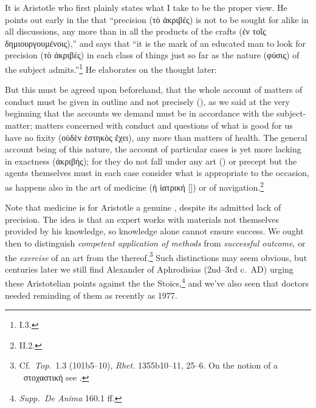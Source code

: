 \documentclass[11pt,letterpaper,oneside]{amsart} %
\begin{document}
It is Aristotle who first plainly states what I take to be the proper view. He points out early in the  that ``precision (τὸ ἀκριβές) is not to be sought for alike in all discussions, any more than in all the products of the crafts (ἐν τοῖς δημιουργουμένοις),'' and says that ``it is the mark of an educated man to look for precision (τὸ ἀκριβές) in each class of things just so far as the nature (φύσις) of the subject admits.''\footnote{ I.3.} He elaborates on the thought later:\begin{squote}[QUOTE]

\vspace{0.05in}

\noindent But this must be agreed upon beforehand, that the whole account of matters of conduct must be given in outline and not precisely (\akribos), as we said at the very beginning that the accounts we demand must be in accordance with the subject-matter; matters concerned with conduct and questions of what is good for us have no fixity (οὐδὲν ἑστηκὸς ἔχει), any more than matters of health. The general account being of this nature, the account of particular cases is yet more lacking in exactness (ἀκριβής); for they do not fall under any art (\techne) or precept but the agents themselves must in each case consider what is appropriate to the occasion, as happens also in the art of medicine (ἡ ἰατρική [\techne]) or of navigation.\footnote{ II.2.}\end{squote} Note that medicine is for Aristotle a genuine \techne, despite its admitted lack of precision. The idea is that an expert works with materials not themselves provided by his knowledge, so knowledge alone cannot ensure success. We ought then to distinguish \emph{competent application of methods} from \emph{successful outcome}, or the \emph{exercise} of an art from the  thereof.\footnote{Cf.\ \emph{Top}.\ 1.3 (101b5--10), \emph{Rhet.} 1355b10--11, 25--6. On the notion of a \techne\ στοχαστική see \citet[pp.\ 88 ff.]{allen1994}.} Such distinctions may seem obvious, but centuries later we still find Alexander of Aphrodisias (2nd--3rd c.\ AD) urging these Aristotelian points against the the Stoics,\footnote{\emph{Supp.\ De Anima} 160.1 ff.} and we've also seen that doctors needed reminding of them as recently as 1977.

    

\end{document}
